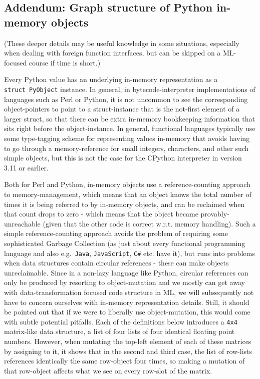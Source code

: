 \documentclass[11pt]{article}
\begin{document}
    \hypertarget{addendum-graph-structure-of-python-in-memory-objects}{%
\subsection{Addendum: Graph structure of Python in-memory
objects}\label{addendum-graph-structure-of-python-in-memory-objects}}

(These deeper details may be useful knowledge in some situations,
especially when dealing with foreign function interfaces, but can be
skipped on a ML-focused course if time is short.)

Every Python value has an underlying in-memory representation as a
\texttt{struct\ PyObject} instance. In general, in bytecode-interpreter
implementations of languages such as Perl or Python, it is not uncommon
to see the corresponding object-pointers to point to a struct-instance
that is the not-first element of a larger struct, so that there can be
extra in-memory bookkeeping information that sits right before the
object-instance. In general, functional languages typically use some
type-tagging scheme for representing values in-memory that avoids having
to go through a memory-reference for small integers, characters, and
other such simple objects, but this is not the case for the CPython
interpreter in version 3.11 or earlier.

Both for Perl and Python, in-memory objects use a reference-counting
approach to memory-management, which means that an object knows the
total number of times it is being referred to by in-memory objects, and
can be reclaimed when that count drops to zero - which means that the
object became provably-unreachable (given that the other code is correct
w.r.t. memory handling). Such a simple reference-counting approach
avoids the problem of requiring some sophisticated Garbage Collection
(as just about every functional programming language and also
e.g.~\texttt{Java}, \texttt{JavaScript}, \texttt{C\#} etc. have it), but
runs into problems when data structures contain circular references -
these can make objects unreclaimable. Since in a non-lazy language like
Python, circular references can only be produced by resorting to
object-mutation and we mostly can get away with data-transformation
focused code structure in ML, we will subsequently not have to concern
ourselves with in-memory representation details. Still, it should be
pointed out that if we were to liberally use object-mutation, this would
come with subtle potential pitfalls. Each of the definitions below
introduces a \texttt{4x4} matrix-like data structure, a list of four
lists of four identical floating point numbers. However, when mutating
the top-left element of each of these matrices by assigning to it, it
shows that in the second and third case, the list of row-lists
references identically the same row-object four times, so making a
mutation of that row-object affects what we see on every row-slot of the
matrix.
\end{document}
